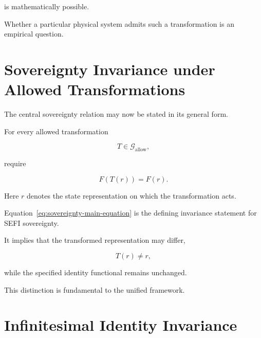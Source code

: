 \documentclass[12pt,oneside]{book}
\begin{document}
is mathematically possible.

Whether a particular physical system admits such a
transformation is an empirical question.


\section{Sovereignty Invariance under Allowed Transformations}
\label{sec:sovereignty-invariance-transformations}

The central sovereignty relation may now be stated in its
general form.

For every allowed transformation

\begin{equation}
    T
    \in
    \mathcal{G}_{\mathrm{allow}},
\end{equation}

require

\begin{equation}
    F(T(r))
    =
    F(r).
    \label{eq:sovereignty-main-equation}
\end{equation}

Here \(r\) denotes the state representation on which the
transformation acts.

Equation~\eqref{eq:sovereignty-main-equation} is the defining
invariance statement for SEFI sovereignty.

It implies that the transformed representation may differ,

\begin{equation}
    T(r)
    \neq
    r,
\end{equation}

while the specified identity functional remains unchanged.

This distinction is fundamental to the unified framework.


\section{Infinitesimal Identity Invariance}
\label{sec:infinitesimal-identity-invariance}
\end{document}
